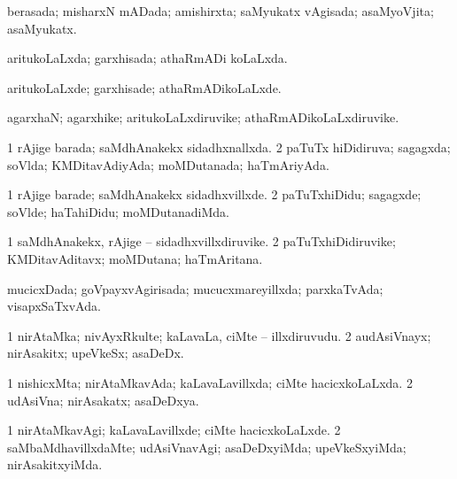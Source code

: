 {\bentry
{} 
\gl{\gu}
\expl{}
\bmng
 berasada; misharxN mADada; amishirxta; saMyukatx vAgisada; asaMyoVjita; asaMyukatx. 
\emng
\eentry

\bentry
{} 
\gl{\gu}
\expl{}
\bmng
 aritukoLaLxda; garxhisada; athaRmADi koLaLxda. 
\emng
\eentry

\bentry
{} 
\gl{\kirxvi}
\expl{}
\bmng
 aritukoLaLxde; garxhisade; athaRmADikoLaLxde. 
\emng
\eentry

\bentry
{} 
\gl{\nA}
\expl{}
\bmng
 agarxhaN; agarxhike; aritukoLaLxdiruvike; athaRmADikoLaLxdiruvike. 
\emng
\eentry

\bentry
{} 
\gl{\gu}
\expl{}
\bmng
\bnum
\num{1} rAjige barada; saMdhAnakekx sidadhxnallxda. 
\num{2} paTuTx hiDidiruva; sagagxda; soVlda; KMDitavAdiyAda; moMDutanada; haTmAriyAda. 
\enum
\emng
\eentry

\bentry
{} 
\gl{\kirxvi}
\expl{}
\bmng
\bnum
\num{1} rAjige barade; saMdhAnakekx sidadhxvillxde. 
\num{2} paTuTxhiDidu; sagagxde; soVlde; haTa{hi}Didu; moMDutanadiMda. 
\enum
\emng
\eentry

\bentry
{} 
\gl{\nA}
\expl{}
\bmng
\bnum
\num{1} saMdhAnakekx, rAjige -- sidadhxvillxdiruvike. 
\num{2} paTuTxhiDidiruvike; KMDitavAditavx; moMDutana; haTmAritana. 
\enum
\emng
\eentry

\bentry
{} 
\gl{\gu}
\expl{}
\bmng
 mucicxDada; goVpayxvAgirisada; mucucxmareyillxda; parxkaTvAda; visapxSaTxvAda. 
\emng
\eentry

\bentry
{} 
\gl{\nA}
\expl{}
\bmng
\bnum
\num{1} nirAtaMka; nivAyxRkulte; kaLavaLa, ciMte -- illxdiruvudu. 
\num{2} audAsiVnayx; nirAsakitx; upeVkeSx; asaDeDx. 
\enum
\emng
\eentry

\bentry
{} 
\gl{\gu}
\expl{}
\bmng
\bnum
\num{1} nishicxMta; nirAtaMkavAda; kaLavaLavillxda; ciMte hacicxkoLaLxda. 
\num{2} udAsiVna; nirAsakatx; asaDeDxya. 
\enum
\emng
\eentry

\bentry
{} 
\gl{\kirxvi}
\expl{}
\bmng
\bnum
\num{1} nirAtaMkavAgi; kaLavaLavillxde; ciMte hacicxkoLaLxde. 
\num{2} saMbaMdhavillxdaMte; udAsiVnavAgi; asaDeDxyiMda; upeVkeSxyiMda; nirAsakitxyiMda. 
\enum
\emng
\eentry

}
